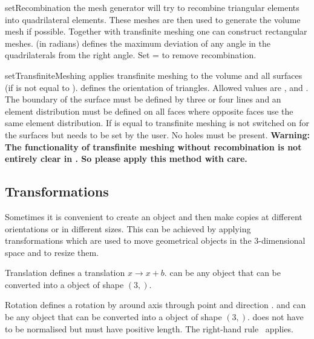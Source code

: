 \begin{methoddesc}[Volume]{setRecombination}{}
the mesh generator will try to recombine triangular elements into
quadrilateral elements. These meshes are then used to generate the volume mesh
if possible.
Together with transfinite meshing one can construct rectangular meshes.
 (in radians) defines the maximum deviation of any angle in
the quadrilaterals from the right angle.
Set = to remove recombination.
\end{methoddesc}

\begin{methoddesc}[Volume]{setTransfiniteMeshing}{}
applies transfinite meshing to the volume and all surfaces (if
 is not equal to ).
 defines the orientation of triangles. Allowed values
are ,  and .
The boundary of the surface must be defined by three or four lines and an
element distribution must be defined on all faces where opposite
faces use the same element distribution.
If  is equal to  transfinite meshing is not
switched on for the surfaces but needs to be set by the user.
No holes must be present.
\textbf{Warning: The functionality of transfinite meshing without
recombination is not entirely clear in \gmshextern.
So please apply this method with care.}
\end{methoddesc}

\subsection{Transformations}

Sometimes it is convenient to create an object and then make copies at
different orientations or in different sizes. This can be achieved by
applying transformations which are used to move geometrical objects in the
3-dimensional space and to resize them.

\begin{classdesc}{Translation}{}
defines a translation $x \to x+b$.  can be any object that can be
converted into a \numpy object of shape $(3,)$.
\end{classdesc}

\begin{classdesc}{Rotation}{ }
defines a rotation by  around axis through point  and direction .
 and  can be any object that can be converted into a
\numpy object of shape $(3,)$.
 does not have to be normalised but must have positive length.
The right-hand rule~\cite{RIGHTHANDRULE} applies.
\end{classdesc}

